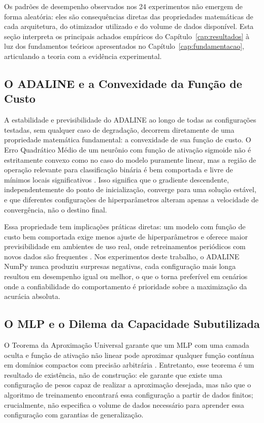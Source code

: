 Os padr\~oes de desempenho observados nos 24 experimentos n\~ao emergem de forma aleat\'oria: eles s\~ao consequ\^encias diretas das propriedades matem\'aticas de cada arquitetura, do otimizador utilizado e do volume de dados dispon\'ivel. Esta se\c c\~ao interpreta os principais achados emp\'iricos do Cap\'itulo~\ref{cap:resultados} \`a luz dos fundamentos te\'oricos apresentados no Cap\'itulo~\ref{cap:fundamentacao}, articulando a teoria com a evid\^encia experimental.

\subsection{O ADALINE e a Convexidade da Fun\c c\~ao de Custo}
\label{sec:discussao_adaline}

A estabilidade e previsibilidade do ADALINE ao longo de todas as configura\c c\~oes testadas, sem qualquer caso de degrada\c c\~ao, decorrem diretamente de uma propriedade matem\'atica fundamental: a convexidade de sua fun\c c\~ao de custo. O Erro Quadr\'atico M\'edio de um neurônio com fun\c c\~ao de ativa\c c\~ao sigmoide n\~ao \'e estritamente convexo como no caso do modelo puramente linear, mas a regi\~ao de opera\c c\~ao relevante para classifica\c c\~ao bin\'aria \'e bem comportada e livre de m\'inimos locais significativos \cite{braga2007,silva2016}. Isso significa que o gradiente descendente, independentemente do ponto de inicializa\c c\~ao, converge para uma solu\c c\~ao est\'avel, e que diferentes configura\c c\~oes de hiperpar\^ametros alteram apenas a velocidade de converg\^encia, n\~ao o destino final.

Essa propriedade tem implica\c c\~oes pr\'aticas diretas: um modelo com fun\c c\~ao de custo bem comportada exige menos ajuste de hiperpar\^ametros e oferece maior previsibilidade em ambientes de uso real, onde retreinamentos peri\'odicos com novos dados s\~ao frequentes \cite{silva2016}. Nos experimentos deste trabalho, o ADALINE NumPy nunca produziu surpresas negativas, cada configura\c c\~ao mais longa resultou em desempenho igual ou melhor, o que o torna prefer\'ivel em cen\'arios onde a confiabilidade do comportamento \'e prioridade sobre a maximiza\c c\~ao da acur\'acia absoluta.

\subsection{O MLP e o Dilema da Capacidade Subutilizada}
\label{sec:discussao_mlp}

O Teorema da Aproxima\c c\~ao Universal garante que um MLP com uma camada oculta e fun\c c\~ao de ativa\c c\~ao n\~ao linear pode aproximar qualquer fun\c c\~ao cont\'inua em dom\'inios compactos com precis\~ao arbitr\'aria \cite{braga2007}. Entretanto, esse teorema \'e um resultado de exist\^encia, n\~ao de constru\c c\~ao: ele garante que existe uma configura\c c\~ao de pesos capaz de realizar a aproxima\c c\~ao desejada, mas n\~ao que o algoritmo de treinamento encontrar\'a essa configura\c c\~ao a partir de dados finitos; crucialmente, n\~ao especifica o volume de dados necess\'ario para aprender essa configura\c c\~ao com garantias de generaliza\c c\~ao.

